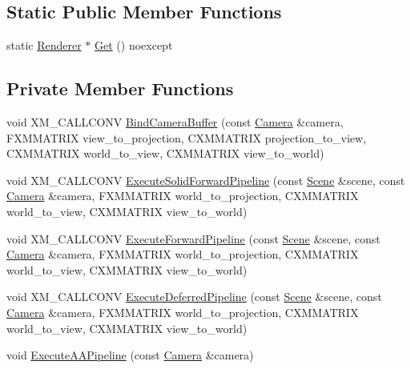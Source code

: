 \subsection*{Static Public Member Functions}
\begin{DoxyCompactItemize}
\item 
static \hyperlink{classmage_1_1_renderer}{Renderer} $\ast$ \hyperlink{classmage_1_1_renderer_a401f8e17f60d8546b30de22943ac35db}{Get} () noexcept
\end{DoxyCompactItemize}
\subsection*{Private Member Functions}
\begin{DoxyCompactItemize}
\item 
void X\+M\+\_\+\+C\+A\+L\+L\+C\+O\+NV \hyperlink{classmage_1_1_renderer_a9c49991b051183c89308b81ff02eda35}{Bind\+Camera\+Buffer} (const \hyperlink{classmage_1_1_camera}{Camera} \&camera, F\+X\+M\+M\+A\+T\+R\+IX view\+\_\+to\+\_\+projection, C\+X\+M\+M\+A\+T\+R\+IX projection\+\_\+to\+\_\+view, C\+X\+M\+M\+A\+T\+R\+IX world\+\_\+to\+\_\+view, C\+X\+M\+M\+A\+T\+R\+IX view\+\_\+to\+\_\+world)
\item 
void X\+M\+\_\+\+C\+A\+L\+L\+C\+O\+NV \hyperlink{classmage_1_1_renderer_af262c5909fc943477d9723828987c0d5}{Execute\+Solid\+Forward\+Pipeline} (const \hyperlink{classmage_1_1_scene}{Scene} \&scene, const \hyperlink{classmage_1_1_camera}{Camera} \&camera, F\+X\+M\+M\+A\+T\+R\+IX world\+\_\+to\+\_\+projection, C\+X\+M\+M\+A\+T\+R\+IX world\+\_\+to\+\_\+view, C\+X\+M\+M\+A\+T\+R\+IX view\+\_\+to\+\_\+world)
\item 
void X\+M\+\_\+\+C\+A\+L\+L\+C\+O\+NV \hyperlink{classmage_1_1_renderer_afd977cdfa89847cc0529e0b793af9988}{Execute\+Forward\+Pipeline} (const \hyperlink{classmage_1_1_scene}{Scene} \&scene, const \hyperlink{classmage_1_1_camera}{Camera} \&camera, F\+X\+M\+M\+A\+T\+R\+IX world\+\_\+to\+\_\+projection, C\+X\+M\+M\+A\+T\+R\+IX world\+\_\+to\+\_\+view, C\+X\+M\+M\+A\+T\+R\+IX view\+\_\+to\+\_\+world)
\item 
void X\+M\+\_\+\+C\+A\+L\+L\+C\+O\+NV \hyperlink{classmage_1_1_renderer_a3fb91b8f8f0022e9e8381103c7e23427}{Execute\+Deferred\+Pipeline} (const \hyperlink{classmage_1_1_scene}{Scene} \&scene, const \hyperlink{classmage_1_1_camera}{Camera} \&camera, F\+X\+M\+M\+A\+T\+R\+IX world\+\_\+to\+\_\+projection, C\+X\+M\+M\+A\+T\+R\+IX world\+\_\+to\+\_\+view, C\+X\+M\+M\+A\+T\+R\+IX view\+\_\+to\+\_\+world)
\item 
void \hyperlink{classmage_1_1_renderer_a9ffd7b8c58e4647b38d864778d53d390}{Execute\+A\+A\+Pipeline} (const \hyperlink{classmage_1_1_camera}{Camera} \&camera)
\end{DoxyCompactItemize}
